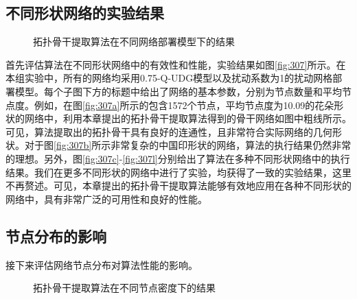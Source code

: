 \subsection{不同形状网络的实验结果}
\begin{figure}[t]
  \centering
  \hspace{0.25em}%
  \hspace{0.25em}%
\caption{拓扑骨干提取算法在不同网络部署模型下的结果}
\label{fig:308}
\end{figure}
首先评估算法在不同形状网络中的有效性和性能，实验结果如图\ref{fig:307}所示。在本组实验中，所有的网络均采用0.75-Q-UDG模型以及扰动系数为1的扰动网格部署模型。每个子图下方的标题中给出了网络的基本参数，分别为节点数量和平均节点度。例如，在图\ref{fig:307a}所示的包含1572个节点，平均节点度为10.09的花朵形状的网络中，利用本章提出的拓扑骨干提取算法得到的骨干网络如图中粗线所示。可见，算法提取出的拓扑骨干具有良好的连通性，且非常符合实际网络的几何形状。对于图\ref{fig:307b}所示非常复杂的中国印形状的网络，算法的执行结果仍然非常的理想。另外，图\ref{fig:307c}-\ref{fig:307l}分别给出了算法在多种不同形状网络中的执行结果。我们在更多不同形状的网络中进行了实验，均获得了一致的实验结果，这里不再赘述。可见，本章提出的拓扑骨干提取算法能够有效地应用在各种不同形状的网络中，具有非常广泛的可用性和良好的性能。
\subsection{节点分布的影响}
接下来评估网络节点分布对算法性能的影响。
\begin{figure}[t]
  \centering
  \hspace{0.25em}%
  \hspace{0.25em}%
  \hspace{0.25em}%
\caption{拓扑骨干提取算法在不同节点密度下的结果}
\label{fig:309}
\end{figure}

